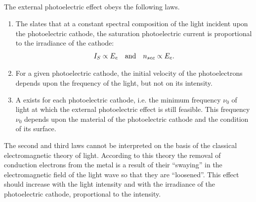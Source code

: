 \subsection{}\label{37.1.3} The external photoelectric effect obeys the following laws.
\begin{enumerate}[label=\arabic*.]
\item The  slates that at a constant spectral composition of the light incident upon the photoelectric cathode, the saturation photoelectric current is proportional to the irradiance  of the cathode:
\begin{equation*}%
I_{S} \propto E_{e} \qand n_{sec} \propto E_{e}.
\end{equation*}
\item For a given photoelectric cathode, the initial velocity of the photoelectrons depends upon the frequency of the light, but not on its intensity.
\item A  exists for each photoelectric cathode, i.e. the minimum frequency $\nu_{0}$ of light at which the external photoelectric effect is still feasible. This frequency $\nu_{0}$ depends upon the material of the photoelectric cathode and the condition of its surface.
\end{enumerate}
The second and third laws cannot be interpreted on the basis
of the classical electromagnetic theory of light. According to
this theory the removal of conduction electrons from the metal
is a result of their ``swaying'' in the electromagnetic field of the light wave so that they are ``loosened''. This effect should increase with the light intensity and with the irradiance of the photoelectric cathode, proportional to the intensity.

